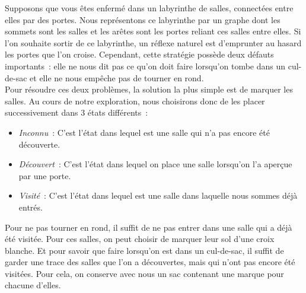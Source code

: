 \documentclass{magnolia}
\begin{document}
Supposons que vous êtes enfermé dans un labyrinthe de salles, connectées entre elles
par des portes. Nous représentons ce labyrinthe par un graphe dont les sommets sont
les salles et les arêtes sont les portes reliant ces salles entre elles. Si l'on souhaite sortir de ce labyrinthe,
un réflexe naturel est d'emprunter au hasard les portes que l'on croise. Cependant,
cette stratégie possède deux défauts importants~: elle ne nous dit pas ce qu'on doit
faire lorsqu'on tombe dans un cul-de-sac et elle ne nous empêche pas de tourner en rond.\\

Pour résoudre ces deux problèmes, la solution la plus simple est de marquer les
salles. Au cours de notre exploration, nous choisirons donc de les placer
successivement dans 3 états différents~:
\begin{itemize}
\item \emph{Inconnu}~: C'est l'état dans lequel est une salle qui n'a pas encore été
  découverte.
\item \emph{Découvert}~: C'est l'état dans lequel on place une salle lorsqu'on l'a aperçue
  par une porte.
\item \emph{Visité}~: C'est l'état dans lequel est une salle dans laquelle nous sommes
  déjà entrés.
\end{itemize}
Pour ne pas tourner en rond, il suffit de ne pas entrer dans une salle qui a déjà
été visitée. Pour ces salles, on peut choisir de marquer leur sol d'une croix blanche.
Et pour savoir que faire lorsqu'on est dans un cul-de-sac, il suffit de garder une trace
des salles que l'on a découvertes, mais qui n'ont pas encore été visitées. Pour cela, on
conserve avec nous un sac contenant une marque pour chacune d'elles.\\
\end{document}
